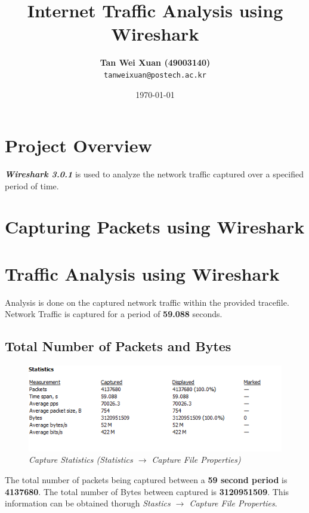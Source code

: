 \documentclass[a4paper,11pt]{article}
\begin{document}
\title{\vspace{-1.0cm}\textbf{Internet Traffic Analysis using Wireshark}}
\author{
  \textbf{Tan Wei Xuan (49003140)}\\
  \texttt{tanweixuan@postech.ac.kr}
}
\date{\today}
\maketitle

\section{Project Overview}
\textit{\textbf{Wireshark 3.0.1}} is used to analyze the network traffic captured over a specified period of time.

\section{Capturing Packets using Wireshark}

\section{Traffic Analysis using Wireshark}
Analysis is done on the captured network traffic within the provided tracefile. Network Traffic is captured for a period of \textbf{59.088} seconds.

\subsection{Total Number of Packets and Bytes}
\begin{figure}[h!]
	\includegraphics{TtlNoPacketsBytes}
	\caption{\textit{Capture Statistics (Statistics $\rightarrow$ Capture File Properties)}}
\end{figure}
The total number of packets being captured between a \textbf{59 second period} is \textbf{4137680}. The total number of Bytes between captured is \textbf{3120951509}. This information can be obtained thorugh \textit{Stastics $\rightarrow$ Capture File Properties}.
\end{document}
